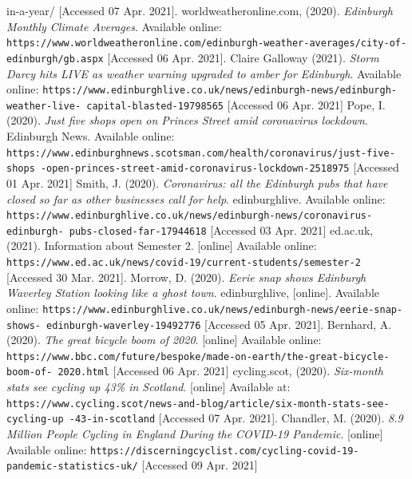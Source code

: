 \documentclass[11pt,a4paper]{article}
\begin{document}
\begin{thebibliography}{9}
{in-a-year/} [Accessed 07 Apr. 2021].
worldweatheronline.com, (2020). \textit{Edinburgh Monthly Climate Averages}. Available online:
\texttt{https://www.worldweatheronline.com/edinburgh-weather-averages/city-of-
edinburgh/gb.aspx} [Accessed 06 Apr. 2021].
Claire Galloway (2021). \textit{Storm Darcy hits LIVE as weather warning upgraded to amber for Edinburgh}. Available online: \texttt{https://www.edinburghlive.co.uk/news/edinburgh-news/edinburgh-weather-live-
capital-blasted-19798565} [Accessed 06 Apr. 2021]
Pope, I. (2020). \textit{Just five shops open on Princes Street amid coronavirus lockdown}. Edinburgh News. Available online: \texttt{https://www.edinburghnews.scotsman.com/health/coronavirus/just-five-shops
-open-princes-street-amid-coronavirus-lockdown-2518975} [Accessed 01 Apr. 2021]
Smith, J. (2020). \textit{Coronavirus: all the Edinburgh pubs that have closed so far as other businesses call for help}. edinburghlive. Available online: \texttt{https://www.edinburghlive.co.uk/news/edinburgh-news/coronavirus-edinburgh-
pubs-closed-far-17944618} [Accessed 03 Apr. 2021]
ed.ac.uk, (2021). Information about Semester 2. [online] Available online: \texttt{https://www.ed.ac.uk/news/covid-19/current-students/semester-2} [Accessed 30 Mar. 2021].
Morrow, D. (2020). \textit{Eerie snap shows Edinburgh Waverley Station looking like a ghost town}. edinburghlive, [online]. Available online: \texttt{https://www.edinburghlive.co.uk/news/edinburgh-news/eerie-snap-shows-
edinburgh-waverley-19492776} [Accessed 05 Apr. 2021].
Bernhard, A. (2020). \textit{The great bicycle boom of 2020}. [online] Available online: \texttt{https://www.bbc.com/future/bespoke/made-on-earth/the-great-bicycle-boom-of-
2020.html} [Accessed 06 Apr. 2021] 
cycling.scot, (2020). \textit{Six-month stats see cycling up 43\% in Scotland}. [online] Available at: \texttt{https://www.cycling.scot/news-and-blog/article/six-month-stats-see-cycling-up
-43-in-scotland} [Accessed 07 Apr. 2021].
Chandler, M. (2020). \textit{8.9 Million People Cycling in England During the COVID-19 Pandemic}. [online] Available online: \texttt{https://discerningcyclist.com/cycling-covid-19-pandemic-statistics-uk/} [Accessed 09 Apr. 2021]
\end{thebibliography}
\end{document}

